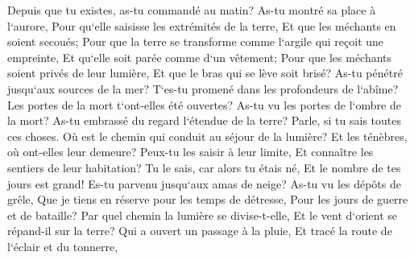 \verse Depuis que tu existes, as-tu commandé au matin? As-tu montré sa place à l`aurore, 
\verse Pour qu`elle saisisse les extrémités de la terre, Et que les méchants en soient secoués; 
\verse Pour que la terre se transforme comme l`argile qui reçoit une empreinte, Et qu`elle soit parée comme d`un vêtement; 
\verse Pour que les méchants soient privés de leur lumière, Et que le bras qui se lève soit brisé? 
\verse As-tu pénétré jusqu`aux sources de la mer? T`es-tu promené dans les profondeurs de l`abîme? 
\verse Les portes de la mort t`ont-elles été ouvertes? As-tu vu les portes de l`ombre de la mort? 
\verse As-tu embrassé du regard l`étendue de la terre? Parle, si tu sais toutes ces choses. 
\verse Où est le chemin qui conduit au séjour de la lumière? Et les ténèbres, où ont-elles leur demeure? 
\verse Peux-tu les saisir à leur limite, Et connaître les sentiers de leur habitation? 
\verse Tu le sais, car alors tu étais né, Et le nombre de tes jours est grand! 
\verse Es-tu parvenu jusqu`aux amas de neige? As-tu vu les dépôts de grêle, 
\verse Que je tiens en réserve pour les temps de détresse, Pour les jours de guerre et de bataille? 
\verse Par quel chemin la lumière se divise-t-elle, Et le vent d`orient se répand-il sur la terre? 
\verse Qui a ouvert un passage à la pluie, Et tracé la route de l`éclair et du tonnerre, 
